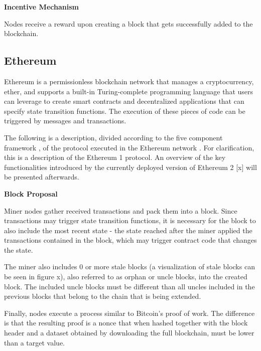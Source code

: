 \vspace{0.25cm}

\textbf{Incentive Mechanism}

Nodes receive a reward upon creating a block that gets successfully added to the blockchain.





\subsection{Ethereum}

Ethereum \cite{ethereum_whitepaper} \cite{ethereum_yellowpaper} is a permissionless blockchain network that manages a cryptocurrency, ether, and supports a built-in Turing-complete programming language that users can leverage to create smart contracts and decentralized applications that can specify state transition functions. The execution of these pieces of code can be triggered by messages and transactions.

The following is a description, divided according to the five component framework \cite{survey_bchain_networks}, of the protocol executed in the Ethereum network \cite{ethereum_whitepaper} \cite{ethereum_yellowpaper}. For clarification, this is a description of the Ethereum 1 protocol. An overview of the key functionalities introduced by the currently deployed version of Ethereum 2 [x] will be presented afterwards.


\vspace{0.5cm}

\textbf{Block Proposal}

Miner nodes gather received transactions and pack them into a block. Since transactions may trigger state transition functions, it is necessary for the block to also include the most recent state - the state reached after the miner applied the transactions contained in the block, which may trigger contract code that changes the state.

The miner also includes 0 or more stale blocks (a visualization of stale blocks can be seen in figure x), also referred to as orphan or uncle blocks, into the created block. The included uncle blocks must be different than all uncles included in the previous blocks that belong to the chain that is being extended.

Finally, nodes execute a process similar to Bitcoin’s proof of work. The difference is that the resulting proof is a nonce that when hashed together with the block header and a dataset obtained by downloading the full blockchain, must be lower than a target value.

